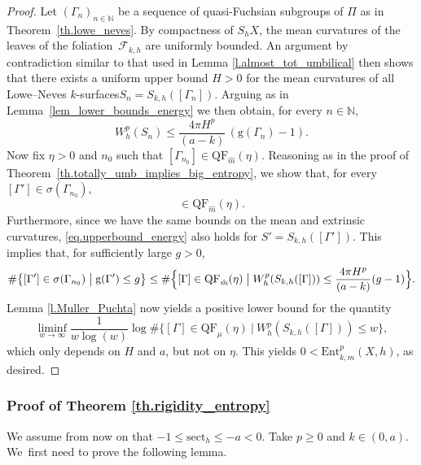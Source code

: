 \documentclass[JEP,XML,SOM,Unicode,NoEqCountersInSection,published]{cedram}
\newcommand{\ksurfaces}{$k$\nobreakdash-surfaces\xspace}
\theoremstyle{plain}
\theoremstyle{definition}
\newcommand{\N}{{\mathbb N}}
\newcommand{\cF}{{\mathcal F}}
\newcommand{\sect}{\mathrm{sect}}
\newcommand{\Ent}{\mathrm{Ent}}
\newcommand{\QF}{\mathrm{QF}}
\begin{document}
\begin{proof} Let $(\Gamma_n)_{n\in\mathbb{N}}$ be a sequence of quasi-Fuchsian subgroups of $\Pi$ as in Theorem~\ref{th.lowe_neves}. By compactness of $S_hX$, the mean curvatures of the leaves of the foliation~$\cF_{k,h}$ are uniformly bounded. An argument by contradiction similar to that used in Lemma \ref{l.almost_tot_umbilical} then shows that there exists a uniform upper bound $H>0$ for the mean curvatures of all Lowe--Neves \ksurfaces $S_n=S_{k,h}([\Gamma_n])$. Arguing as in Lemma~\ref{lem_lower_bounds_energy} we then obtain, for every $n\in\N$,
\begin{equation}\label{eq.upperbound_energy}
W^{p}_{h}(S_n)\leq \frac{4\pi H^p}{(a-k)}\,(\mathrm{g}(\Gamma_n)-1).
\end{equation}
Now fix $\eta>0$ and $n_0$ such that $[\Gamma_{n_0}]\in\QF_{\hat m}(\eta)$. Reasoning as in the proof of Theo\-rem~\ref{th.totally_umb_implies_big_entropy}, we show that, for every $[\Gamma']\in\sigma(\Gamma_{n_0})$,
\begin{equation*}
[\Gamma']\in\QF_{\hat m}(\eta).
\end{equation*}
Furthermore, since we have the same bounds on the mean and extrinsic curvatures, \eqref{eq.upperbound_energy} also holds for $S'=S_{k,h}([\Gamma'])$. This implies that, for sufficiently large $g>0$,
\begin{equation*}
\#\bigl\{[\Gamma']\in\sigma(\Gamma_{n_0})\bigm| \mathrm{g}(\Gamma')\leq g\bigr\}\leq\#\Bigl\{[\Gamma]\in\QF_{\hat m}(\eta)\bigm| W^{p}_{h}(S_{k,h}([\Gamma]))\leq \frac{4\pi H^p}{(a-k)}(g-1)\Bigr\}.
\end{equation*}
Lemma \ref{l.Muller_Puchta} now yields a positive lower bound for the quantity
\begin{equation*}
\liminf_{w\to\infty}\frac{1}{w\log(w)}\log\#\bigl\{[\Gamma]\in\QF_\mu(\eta)\ \big|\ W^{p}_{h}(S_{k,h}([\Gamma]))\leq w\bigr\},
\end{equation*}
which only depends on $H$ and $a$, but not on $\eta$. This yields $0<\Ent^p_{k,\hat m}(X,h)$, as desired.
\end{proof}


\subsubsection{Proof of Theorem \ref{th.rigidity_entropy}} We assume from now on that $-1\leq\sect_h\leq -a <0$. Take $p\geq 0$ and $k\in(0,a)$. We~first need to prove the following lemma.
\end{document}
